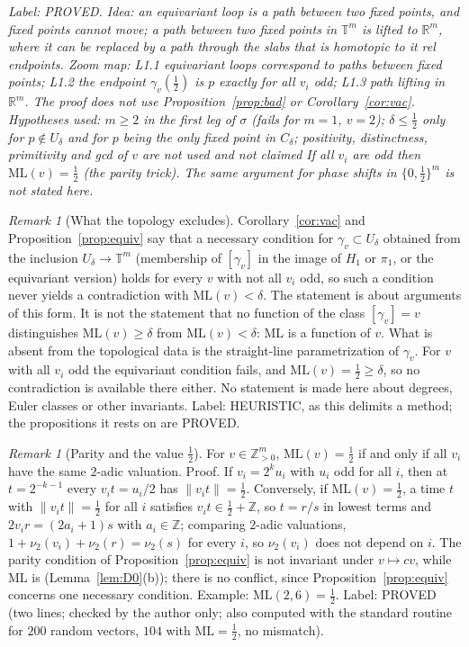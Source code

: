 \documentclass[11pt]{article}
\theoremstyle{remark}
\newtheorem{remark}[theorem]{Remark}
\newcommand{\norm}[1]{\lVert #1\rVert}
\newcommand{\ML}{\mathrm{ML}}
\newcommand{\Z}{\mathbb{Z}}
\newcommand{\R}{\mathbb{R}}
\newcommand{\lab}[1]{\par\smallskip\noindent\textit{Label: #1.}}
\begin{document}
\lab{PROVED. Idea: an equivariant loop is a path between two fixed points, and fixed points cannot move; a path between two fixed points in $\mathbb T^m$ is lifted to $\R^m$, where it can be replaced by a path through the slabs that is homotopic to it rel endpoints. Zoom map: L1.1 equivariant loops correspond to paths between fixed points; L1.2 the endpoint $\gamma_v(\frac12)$ is $p$ exactly for all $v_i$ odd; L1.3 path lifting in $\R^m$. The proof does not use Proposition~\ref{prop:bad} or Corollary~\ref{cor:vac}. Hypotheses used: $m\ge2$ in the first leg of $\sigma$ (fails for $m=1$, $v=2$); $\delta\le\frac12$ only for $p\notin U_\delta$ and for $p$ being the only fixed point in $C_\delta$; positivity, distinctness, primitivity and gcd of $v$ are not used and not claimed If all $v_i$ are odd then $\ML(v)=\frac12$ (the parity trick). The same argument for phase shifts in $\{0,\frac12\}^m$ is not stated here}

\begin{remark}[What the topology excludes]\label{rem:topo}
Corollary~\ref{cor:vac} and Proposition~\ref{prop:equiv} say that a necessary condition for $\gamma_v\subset U_\delta$ obtained from the inclusion $U_\delta\to\mathbb T^m$ (membership of $[\gamma_v]$ in the image of $H_1$ or $\pi_1$, or the equivariant version) holds for every $v$ with not all $v_i$ odd, so such a condition never yields a contradiction with $\ML(v)<\delta$. The statement is about arguments of this form. It is not the statement that no function of the class $[\gamma_v]=v$ distinguishes $\ML(v)\ge\delta$ from $\ML(v)<\delta$: $\ML$ is a function of $v$. What is absent from the topological data is the straight-line parametrization of $\gamma_v$. For $v$ with all $v_i$ odd the equivariant condition fails, and $\ML(v)=\frac12\ge\delta$, so no contradiction is available there either. No statement is made here about degrees, Euler classes or other invariants. Label: HEURISTIC, as this delimits a method; the propositions it rests on are PROVED.
\end{remark}

\begin{remark}[Parity and the value $\frac12$]\label{rem:twoadic}
For $v\in\Z_{>0}^m$, $\ML(v)=\frac12$ if and only if all $v_i$ have the same $2$-adic valuation. Proof. If $v_i=2^ku_i$ with $u_i$ odd for all $i$, then at $t=2^{-k-1}$ every $v_it=u_i/2$ has $\norm{v_it}=\frac12$. Conversely, if $\ML(v)=\frac12$, a time $t$ with $\norm{v_it}=\frac12$ for all $i$ satisfies $v_it\in\frac12+\Z$, so $t=r/s$ in lowest terms and $2v_ir=(2a_i+1)s$ with $a_i\in\Z$; comparing $2$-adic valuations, $1+\nu_2(v_i)+\nu_2(r)=\nu_2(s)$ for every $i$, so $\nu_2(v_i)$ does not depend on $i$. The parity condition of Proposition~\ref{prop:equiv} is not invariant under $v\mapsto cv$, while $\ML$ is (Lemma~\ref{lem:D0}(b)); there is no conflict, since Proposition~\ref{prop:equiv} concerns one necessary condition. Example: $\ML(2,6)=\frac12$. Label: PROVED (two lines; checked by the author only; also computed with the standard routine for $200$ random vectors, $104$ with $\ML=\frac12$, no mismatch).
\end{remark}
\end{document}
